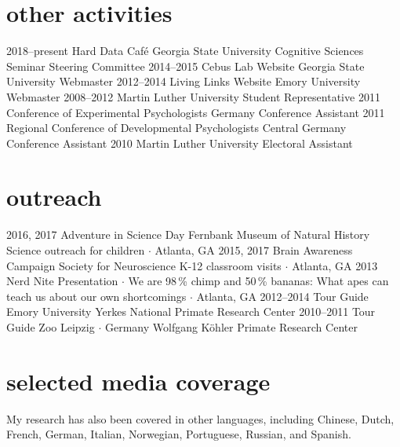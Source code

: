 \documentclass[]{friggeri-cv}
\begin{document}
\section{other activities}

\begin{entrylist}
  \entry
    {2018--present}
    {Hard Data Café}
    {Georgia State University}
    {Cognitive Sciences Seminar Steering Committee}
  \entry
    {2014--2015}
    {Cebus Lab Website}
    {Georgia State University}
    {Webmaster}
  \entry
    {2012--2014}
    {Living Links Website}
    {Emory University}
    {Webmaster}
  \entry
    {2008--2012}
    {Martin Luther University}
    {}
    {Student Representative}
 \entry
   {2011}
   {Conference of Experimental Psychologists}
   {Germany}
   {Conference Assistant}
 \entry
   {2011}
   {Regional Conference of Developmental Psychologists}
   {Central Germany}
   {Conference Assistant}
 \entry
   {2010}
   {Martin Luther University}
   {}
   {Electoral Assistant}
\end{entrylist}



\section{outreach}

\begin{entrylist}
  \entry
    {2016, 2017}
    {Adventure in Science Day}
    {Fernbank Museum of Natural History}
    {Science outreach for children $\cdot$ Atlanta, GA}
  \entry
    {2015, 2017}
    {Brain Awareness Campaign}
    {Society for Neuroscience}
    {K-12 classroom visits $\cdot$ Atlanta, GA}
  \entry
    {2013}
    {Nerd Nite}
    {}
    {Presentation $\cdot$ We are 98\,\% chimp and 50\,\% bananas: What apes can teach us about our own shortcomings $\cdot$ Atlanta, GA}
  \entry
    {2012--2014}
    {Tour Guide}
    {Emory University}
    {Yerkes National Primate Research Center}
  \entry
    {2010--2011}
    {Tour Guide}
    {Zoo Leipzig $\cdot$ Germany}
    {Wolfgang K\"{o}hler Primate Research Center}
\end{entrylist}



\section{selected media coverage}
\vspace{-.1cm}
{\small{} My research has also been covered in other languages, including Chinese, Dutch,  French, German, Italian, Norwegian, Portuguese, Russian, and Spanish.}\\[.7cm]
\end{document}
